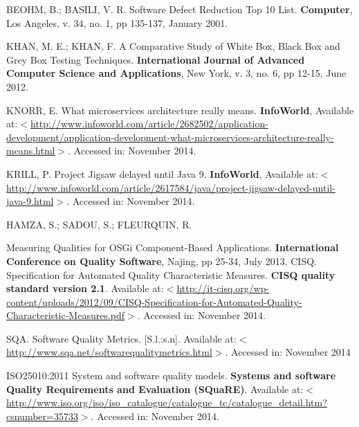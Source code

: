 \documentclass[cic,tc,english]{iiufrgs} %
\begin{document}
%


\begin{thebibliography}{este-parametro-nao-eh-usado-pelo-estilo-ABNT}

 BEOHM, B.; BASILI, V. R.
Software Defect Reduction Top 10 List. \textbf{Computer}, Los Angeles, v. 34, no. 1, pp 135-137, January 2001.

 KHAN, M. E.; KHAN, F.
A Comparative Study of White Box, Black Box and Grey Box Testing Techniques. \textbf{International Journal of Advanced Computer Science and Applications}, New York, v. 3, no. 6, pp 12-15, June 2012.

 KNORR, E.
What microservices architecture really means. \textbf{InfoWorld}, Available at:$<$\url{http://www.infoworld.com/article/2682502/application-development/application-development-what-microservices-architecture-really-means.html}$>$. Accessed in: November 2014.

 KRILL, P.
Project Jigsaw delayed until Java 9. \textbf{InfoWorld}, Available at:$<$\url{http://www.infoworld.com/article/2617584/java/project-jigsaw-delayed-until-java-9.html}$>$. Accessed in: November 2014.

 HAMZA, S.; SADOU, S.; FLEURQUIN, R.

Measuring Qualities for OSGi Component-Based Applications. \textbf{International Conference on Quality Software}, Najing, pp 25-34, July 2013.
 CISQ.
Specification for Automated Quality Characteristic Measures. \textbf{CISQ quality standard version 2.1}. Available at:$<$\url{http://it-cisq.org/wp-content/uploads/2012/09/CISQ-Specification-for-Automated-Quality-Characteristic-Measures.pdf}$>$. Accessed in: November 2014.

 SQA.
Software Quality Metrics. [S.l.:s.n]. Available at:$<$\url{http://www.sqa.net/softwarequalitymetrics.html}$>$. Accessed in: November 2014

 ISO25010:2011
System and software quality models. \textbf{Systems and software Quality Requirements and Evaluation (SQuaRE)}. Available at:$<$\url{http://www.iso.org/iso/iso_catalogue/catalogue_tc/catalogue_detail.htm?csnumber=35733}$>$. Accessed in: November 2014.


\end{thebibliography}
\end{document}
